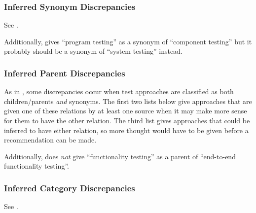     \subsubsection{Inferred Synonym Discrepancies}
    See .

    \begin{enumerate}
        
    \end{enumerate}

    Additionally, \citet[p.~46]{Kam2008} gives ``program testing'' as a synonym
    of ``component testing'' but it probably should be a synonym of ``system
    testing'' instead.

    \subsubsection{Inferred Parent Discrepancies}
    As in , some discrepancies occur when test approaches
    are classified as both children/parents \emph{and} synonyms. The first two
    lists below give approaches that are given one of these relations by at
    least one source when it may make more sense for them to have the other
    relation. The third list gives approaches that could be inferred to have
    either relation, so more thought would have to be given before a
    recommendation can be made.

    

    Additionally, \citep[Tab.~2]{Gerrard2000a} does \emph{not} give
    ``functionality testing'' as a parent of ``end-to-end functionality testing''.

    \subsubsection{Inferred Category Discrepancies}
    See .

    


